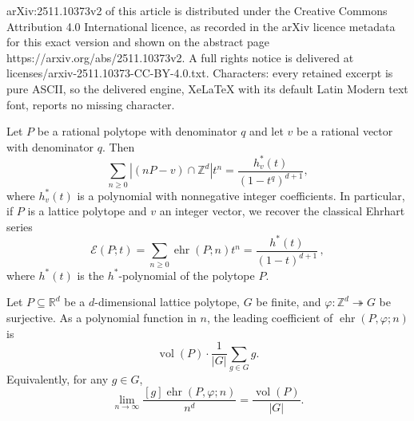 \documentclass[10pt,a4paper]{amsart}
\DeclareMathOperator{\ehr}{ehr}
\DeclareMathOperator{\vol}{vol}
\newcommand{\R}{\mathbb{R}}
\newcommand{\Z}{\mathbb{Z}}
\begin{document}
arXiv:2511.10373v2 of this article is distributed under the Creative Commons Attribution 4.0 International licence, as recorded in the arXiv licence metadata for this exact version and shown on the abstract page https://arxiv.org/abs/2511.10373v2. A full rights notice is delivered at licenses/arxiv-2511.10373-CC-BY-4.0.txt. Characters: every retained excerpt is pure ASCII, so the delivered engine, XeLaTeX with its default Latin Modern text font, reports no missing character.
\begin{thm}
    \label{prop:translation}
Let $P$ be a rational polytope with denominator $q$ and let $v$ be a rational vector with denominator $q$. Then
$$\sum_{n\geq 0}|(nP-v)\cap \Z^d|t^n=\frac{h_v^*(t)}{(1-t^q)^{d+1}},$$
where $h_v^*(t)$ is a polynomial with nonnegative integer coefficients. In particular, if $P$ is a lattice polytope and $v$ an integer vector, we recover the classical Ehrhart series
$$\mathcal E(P;t) = \sum_{n\geq 0}\ehr(P;n)t^n=\frac{h^*(t)}{(1-t)^{d+1}} \, ,$$
where $h^*(t)$ is the $h^*$-polynomial of the polytope $P$.
\end{thm}

\begin{thm}\label{thm:volume}
Let $P \subseteq \R^d$ be a $d$-dimensional lattice polytope, $G$ be finite, and $\varphi:\Z^d \twoheadrightarrow G$ be surjective. As a polynomial function  in $n$, the leading coefficient of $\ehr(P,\varphi;n)$ is  \[\vol(P) \cdot \frac{1}{|G|} \sum_{g \in G} g.\] 
Equivalently, for any $g \in G$,
\[
\lim_{n \to \infty} \frac{[g]\ehr(P,\varphi;n)}{n^d}= \frac{\vol(P)}{|G|}.
\]
\end{thm}
\end{document}
